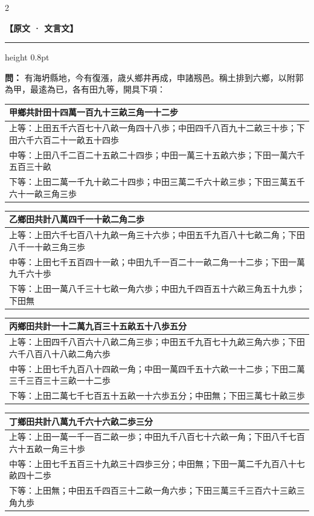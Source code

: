 \documentclass[11pt,a4paper]{article}
\newcommand{\ClassicalQuestion}[1]{\par\noindent\textbf{\color{problemcolor}問：}#1\par}
\newcommand{\ClassicalHeader}{%
  \begin{center}\textbf{\color{headerclassical}【原文 · 文言文】}\end{center}
  \vspace{-0.5em}
  \hrule height 0.8pt
  \vspace{0.5em}
}
\begin{document}
\begin{paracol}{2}

\ClassicalHeader

\ClassicalQuestion{%
有海坍縣地，今有復漲，歳乆鄉井再成，申諸剏邑。稱土排到六鄉，以附郭為甲，最逺為已，各有田九等，開具下項：

\begin{longtable}{p{0.85\textwidth}}
\toprule
\textbf{甲鄉}共計田十四萬一百九十三畝三角一十二步\\
\midrule
\endhead
上等：上田五千六百七十八畝一角四十八歩；中田四千八百九十二畝三十歩；下田六千六百二十一畝五十四歩\\
中等：上田八千二百二十五畝二十四歩；中田一萬三十五畝六歩；下田一萬六千五百三十畝\\
下等：上田二萬一千九十畝二十四歩；中田三萬二千六十畝三歩；下田三萬五千六十一畝三角三歩\\
\bottomrule
\end{longtable}

\begin{longtable}{p{0.85\textwidth}}
\toprule
\textbf{乙鄉}田共計八萬四千一十畝二角二歩\\
\midrule
\endhead
上等：上田六千七百八十九畝一角三十六歩；中田五千九百八十七畝二角；下田八千一十畝三角三歩\\
中等：上田七千五百四十一畝；中田九千一百二十一畝二角一十二歩；下田一萬九千六十歩\\
下等：上田一萬八千三十七畝一角六歩；中田九千四百五十六畝三角五十九歩；下田無\\
\bottomrule
\end{longtable}

\begin{longtable}{p{0.85\textwidth}}
\toprule
\textbf{丙鄉}田共計一十二萬九百三十五畝五十八歩五分\\
\midrule
\endhead
上等：上田四千八百六十八畝二角三歩；中田五千九百七十九畝三角六歩；下田六千八百八十八畝二角六歩\\
中等：上田七千九百八十四畝一角；中田一萬四千五十六畝一十二歩；下田二萬三千三百三十三畝一十二歩\\
下等：上田二萬七千七百五十五畝一十六歩五分；中田無；下田三萬七十畝三歩\\
\bottomrule
\end{longtable}

\begin{longtable}{p{0.85\textwidth}}
\toprule
\textbf{丁鄉}田共計八萬九千六十六畝二歩三分\\
\midrule
\endhead
上等：上田一萬一千一百二畝一歩；中田九千八百七十六畝一角；下田八千七百六十五畝一角三十歩\\
中等：上田七千五百三十九畝三十四歩三分；中田無；下田一萬二千九百八十七畝四十二歩\\
下等：上田無；中田五千四百三十二畝一角六歩；下田三萬三千三百六十三畝三角九歩\\
\bottomrule
\end{longtable}

}
\end{paracol}
\end{document}
